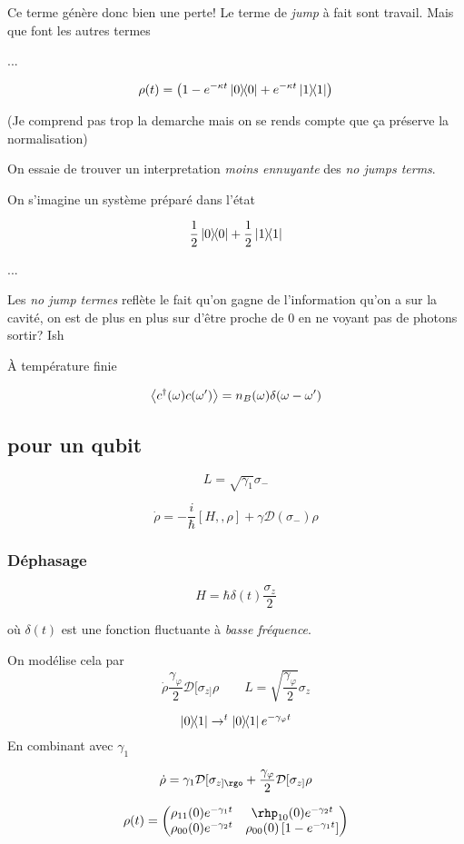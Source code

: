 Ce terme génère donc bien une perte! Le terme de \textit{jump} à fait sont travail. Mais que font les autres termes \textinterrobang

...

\[ \rho(t) = \left( 1- e^{-\kappa t} \ketbra{0} + e^{-\kappa t} \ketbra{1} \right)  \]

(Je comprend pas trop la demarche mais on se rends compte que ça préserve la normalisation)

On essaie de trouver un interpretation \textit{moins ennuyante} des \textit{no jumps terms}.

On s'imagine un système préparé dans l'état 

\[ \frac{1}{2} \ketbra{0} + \frac{1}{2} \ketbra{1} \]

...

Les \textit{no jump termes} reflète le fait qu'on gagne de l'information qu'on a sur la cavité, on est de plus en plus sur d'être proche de 0 en ne voyant pas de photons sortir? Ish


À température finie

\[ \expval{c^{\dagger}(\omega) c(\omega')} = n_B (\omega) \delta(\omega-\omega') \]


\subsection{pour un qubit}


\[ L = \sqrt{\gamma_{1}} \sigma_-  \]

\[ \dot \rho = - \frac{i}{\hbar} [H,, \rho] + \gamma \mathcal{D}(\sigma_- )\rho \]

\subsubsection{Déphasage}


\[ H = \hbar \delta(t) \frac{\sigma_z}{2}  \]

où $\delta(t)$ est une fonction fluctuante à \textit{basse fréquence}.

On modélise cela par \[ \dot \rho \frac{\gamma_{\varphi}}{2} \mathcal{D}[\sigma_{z]} \rho \qquad L = \sqrt{\frac{\gamma_{\varphi}}{2} }\sigma_z \]

\[ \ketbra{0}{1} \to^{t} \ketbra{0}{1}e^{-\gamma_{\varphi} t} \]
En combinant avec $\gamma_1$

\[ \dot \rho = \gamma_1 \mathcal{D}[\sigma_{z]\rgo} + \frac{\gamma_{\varphi}}{2} \mathcal{D}[\sigma_{z]} \rho \]

\[ \rho(t) = \begin{pmatrix} \rho_{11} (0) e^{-\gamma_1 t} & \rhp_{10} (0) e^{-\gamma_2 t} \\ \rho_{00} (0) e^{-\gamma_2 t} & \rho_{00} (0) \left[ 1 - e^{-\gamma_1 t} \right] 	
\end{pmatrix} \]







